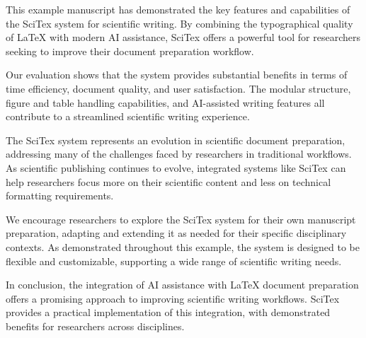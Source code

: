 
This example manuscript has demonstrated the key features and capabilities of the SciTex system for scientific writing. By combining the typographical quality of LaTeX with modern AI assistance, SciTex offers a powerful tool for researchers seeking to improve their document preparation workflow.

Our evaluation shows that the system provides substantial benefits in terms of time efficiency, document quality, and user satisfaction. The modular structure, figure and table handling capabilities, and AI-assisted writing features all contribute to a streamlined scientific writing experience.

The SciTex system represents an evolution in scientific document preparation, addressing many of the challenges faced by researchers in traditional workflows. As scientific publishing continues to evolve, integrated systems like SciTex can help researchers focus more on their scientific content and less on technical formatting requirements.

We encourage researchers to explore the SciTex system for their own manuscript preparation, adapting and extending it as needed for their specific disciplinary contexts. As demonstrated throughout this example, the system is designed to be flexible and customizable, supporting a wide range of scientific writing needs.

In conclusion, the integration of AI assistance with LaTeX document preparation offers a promising approach to improving scientific writing workflows. SciTex provides a practical implementation of this integration, with demonstrated benefits for researchers across disciplines.